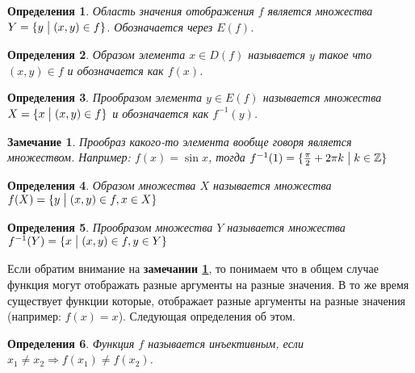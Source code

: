 \documentclass[a4paper, 16pt, oneside]{book}
\newtheorem{Definition}{Определения}[theorem]
\newtheorem{Note}{Замечание}[theorem]
\begin{document}
\begin{Definition}
	\label{definition:function_range_of_values}
	Область значения отображения \(f\) является множества \(Y = \{y \bigm| (x, y) \in f\}\). Обозначается через \(E(f)\).
\end{Definition}

\begin{Definition}
	\label{definition:image_of_element}
	Образом элемента \(x \in D(f)\) называется \(y\) такое что \((x, y) \in f\) и обозначается как \(f(x)\).
\end{Definition}

\begin{Definition}
	\label{definition:prototype}
	Прообразом элемента \(y \in E(f)\) называется множества \(X = \{x \bigm| (x, y) \in f\}\) и обозначается как \(f^{-1}(y)\).
\end{Definition}

\begin{Note}
	\label{note:prototype_is_set}
	Прообраз какого-то элемента вообще говоря является множеством. 
	Например: \({f(x)=\sin{x}}\), тогда \linebreak \({f^{-1}(1) = \{\frac{\pi}{2} + 2 \pi k \bigm| k \in \mathbb{Z}\}}\)
\end{Note}

\begin{Definition}
	\label{definition:image_of_set}
	Образом множества \(X\) называется множества \({f(X) = \{y \bigm| (x, y) \in f, x \in X\}}\)
\end{Definition}

\begin{Definition}
	\label{definition:prototype_of_set}
	Прообразом множества \(Y\) называется множества \({f^{-1}(Y) = \{x \bigm| (x, y) \in f, y \in Y\}}\)
\end{Definition}

\par Если обратим внимание на \textbf{замечании \ref{note:prototype_is_set}}, 
то понимаем что в общем случае функция могут отображать разные аргументы на разные значения.
В то же время существует функции которые, отображает разные аргументы на разные значения (например: \({f(x)=x}\)).
Следующая определения об этом.

\begin{Definition}
	\label{definition:injective}
	Функция \(f\) называется инъективным, если \linebreak \({x_1 \neq x_2 \Rightarrow f(x_1) \neq f(x_2)}\). 
\end{Definition}   
\end{document}
